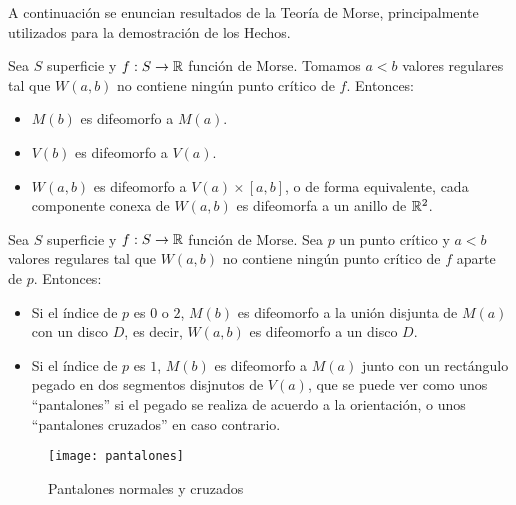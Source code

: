 
A continuación se enuncian resultados de la Teoría de Morse, principalmente utilizados para la demostración de los Hechos.

\begin{teorema}
	Sea $S$ superficie y $f: S \rightarrow \mathbb{R}$ función de Morse. Tomamos $a < b$ valores regulares tal que $W(a,b)$ no contiene ningún punto crítico de $f$. Entonces:
	\begin{itemize}
		\item $M(b)$ es difeomorfo a $M(a)$.
		\item $V(b)$ es difeomorfo a $V(a)$.
		\item $W(a,b)$ es difeomorfo a $V(a) \times [a,b]$, o de forma equivalente, cada componente conexa de $W(a,b)$ es difeomorfa a un anillo de $\mathbb{R}^2$.
	\end{itemize}
\end{teorema}

\begin{teorema}
	Sea $S$ superficie y $f: S \rightarrow \mathbb{R}$ función de Morse. Sea $p$ un punto crítico y $a < b$ valores regulares tal que $W(a,b)$ no contiene ningún punto crítico de $f$ aparte de $p$. Entonces:
	\begin{itemize}
		\item Si el índice de $p$ es $0$ o $2$, $M(b)$ es difeomorfo a la unión disjunta de $M(a)$ con un disco $D$, es decir, $W(a,b)$ es difeomorfo a un disco $D$.
		\item Si el índice de $p$ es $1$, $M(b)$ es difeomorfo a $M(a)$ junto con un rectángulo pegado  en dos segmentos disjnutos de $V(a)$, que se puede ver como unos ``pantalones'' si el pegado se realiza de acuerdo a la orientación, o unos ``pantalones cruzados'' en caso contrario.
	\end{itemize}
\end{teorema}

\begin{figure}[h]
  	\centering
  	\texttt{[image: pantalones]}
  	\caption{Pantalones normales y cruzados}
  	\label{fig:pantalones}
\end{figure}

\endinput
